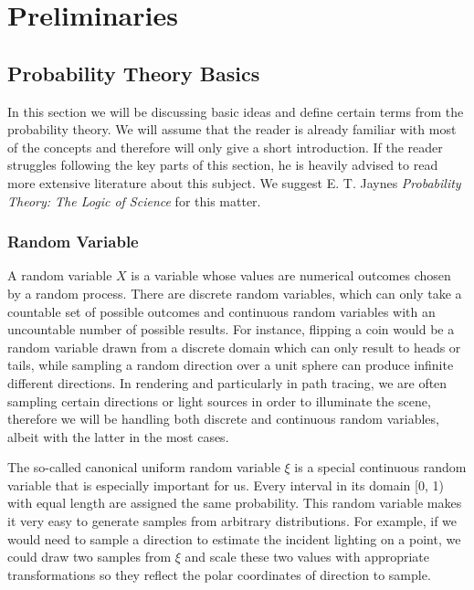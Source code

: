 
\chapter{Preliminaries}
\label{ch:preliminaries}

\section{Probability Theory Basics}
\label{ch:preliminaries:ptb}

In this section we will be discussing basic ideas and define certain terms from the probability theory. We will assume that the reader is already familiar with most of the concepts and therefore will only give a short introduction. If the reader struggles following the key parts of this section, he is heavily advised to read more extensive literature about this subject. We suggest E. T. Jaynes \textit{Probability Theory: The Logic of Science} for this matter. \cite{PTTLS}

\subsection{Random Variable}

A random variable $X$ is a variable whose values are numerical outcomes chosen by a random process. There are discrete random variables, which can only take a countable set of possible outcomes and continuous random variables with an uncountable number of possible results. For instance, flipping a coin would be a random variable drawn from a discrete domain which can only result to heads or tails, while sampling a random direction over a unit sphere can produce infinite different directions. In rendering and particularly in path tracing, we are often sampling certain directions or light sources in order to illuminate the scene, therefore we will be handling both discrete and continuous random variables, albeit with the latter in the most cases.

The so-called canonical uniform random variable $\xi$ is a special continuous random variable that is especially important for us. Every interval in its domain [0, 1) with equal length are assigned the same probability. This random variable makes it very easy to generate samples from arbitrary distributions. For example, if we would need to sample a direction to estimate the incident lighting on a point, we could draw two samples from $\xi$ and scale these two values with appropriate transformations so they reflect the polar coordinates of direction to sample.


